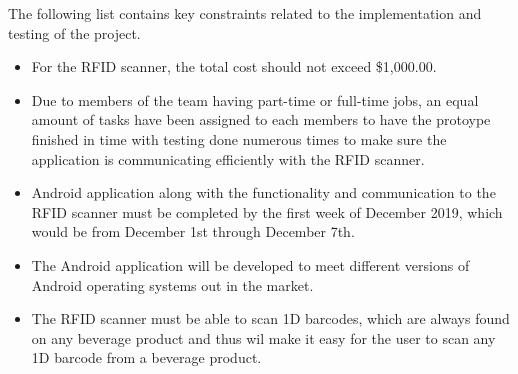 The following list contains key constraints related to the implementation and testing of the project.

\begin{itemize}
  \item For the RFID scanner, the total cost should not exceed \$1,000.00.
  \item Due to members of the team having part-time or full-time jobs, an equal amount of tasks have been assigned to each members to have         the protoype finished in time with testing done numerous times to make sure the application is communicating efficiently with the         RFID scanner.
  \item Android application along with the functionality and communication to the RFID scanner must be completed by the first week of             December 2019, which would be from December 1st through December 7th.
  \item The Android application will be developed to meet different versions of Android operating systems out in the market.
  \item The RFID scanner must be able to scan 1D barcodes, which are always found on any beverage product and thus wil make it easy for           the user to scan any 1D barcode from a beverage product.
\end{itemize}
